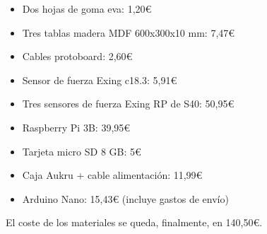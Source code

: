             \begin{itemize}
                \item Dos hojas de goma eva: 1,20\euro{}
                \item Tres tablas madera MDF 600x300x10 mm: 7,47\euro{}
                \item Cables protoboard: 2,60\euro{}
                \item Sensor de fuerza Exing c18.3: 5,91\euro{}
                \item Tres sensores de fuerza Exing RP de S40: 50,95\euro{}
                \item Raspberry Pi 3B: 39,95\euro{}
                \item Tarjeta micro SD 8 GB: 5\euro{}
                \item Caja Aukru + cable alimentación: 11,99\euro{}
                \item Arduino Nano: 15,43\euro{} (incluye gastos de envío)
            \end{itemize}

            El coste de los materiales se queda, finalmente, en 140,50\euro{}.




\newpage
